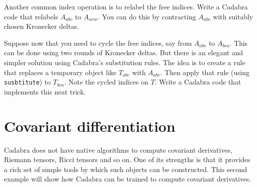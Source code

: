 \documentclass[a4paper,12pt]{article}
\numberwithin{equation}{section}%
\begin{document}
\begin{Exercises}
   \begin{Exercise}
      Another common index operation is to relabel the free indices. Write a Cadabra code
      that relabels $A_{a b c}$ to $A_{u v w}$. You can do this by contracting
      $A_{a b c}$ with suitably chosen Kronecker deltas.
   \end{Exercise}

   \begin{Exercise}
      Suppose now that you need to cycle the free indices, say from $A_{a b c}$ to
      $A_{b c a}$. This can be done using two rounds of Kronecker deltas. But there is an
      elegant and simpler solution using Cadabra's substitution rules. The idea is to
      create a rule that replaces a temporary object like $T_{a b c}$ with $A_{a b c}$.
      Then apply that rule (using \verb|susbtitute|) to $T_{b c a}$. Note the cycled
      indices on $T$. Write a Cadabra code that implements this neat trick.
   \end{Exercise}

\end{Exercises}

\clearpage

\section{Covariant differentiation}%
\label{sec:ex-02}
\ResetCounters



Cadabra does not have native algorithms to compute covariant derivatives, Riemann
tensors, Ricci tensors and so on. One of its strengths is that it provides a rich set of
simple tools by which such objects can be constructed. This second example will show how
Cadabra can be trained to compute covariant derivatives.
\end{document}
